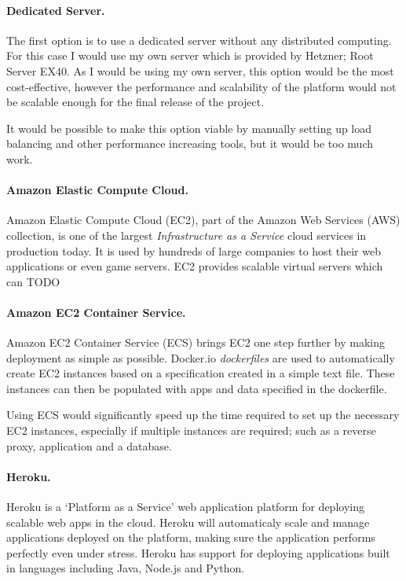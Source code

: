 \documentclass[a4paper, 12pt]{article}
\begin{document}
\paragraph{Dedicated Server.}
The first option is to use a dedicated server without any distributed computing. For this case I would use my own server which is provided by Hetzner; Root Server EX40. As I would be using my own server, this option would be the most cost-effective, however the performance and scalability of the platform would not be scalable enough for the final release of the project.


It would be possible to make this option viable by manually setting up load balancing and other performance increasing tools, but it would be too much work.


\paragraph{Amazon Elastic Compute Cloud.}
Amazon Elastic Compute Cloud (EC2), part of the Amazon Web Services (AWS) collection, is one of the largest \emph{Infrastructure as a Service} cloud services in production today. It is used by hundreds of large companies to host their web applications or even game servers. EC2 provides scalable virtual servers which can TODO


\paragraph{Amazon EC2 Container Service.}
Amazon EC2 Container Service (ECS) brings EC2 one step further by making deployment as simple as possible. Docker.io \emph{dockerfiles} are used to automatically create EC2 instances based on a specification created in a simple text file. These instances can then be populated with apps and data specified in the dockerfile.


Using ECS would significantly speed up the time required to set up the necessary EC2 instances, especially if multiple instances are required; such as a reverse proxy, application and a database.

\paragraph{Heroku.}
Heroku is a `Platform as a Service' web application platform for deploying scalable web apps in the cloud. Heroku will automaticaly scale and manage applications deployed on the platform, making sure the application performs perfectly even under stress. Heroku has support for deploying applications built in languages including Java, Node.js and Python.
\end{document}
